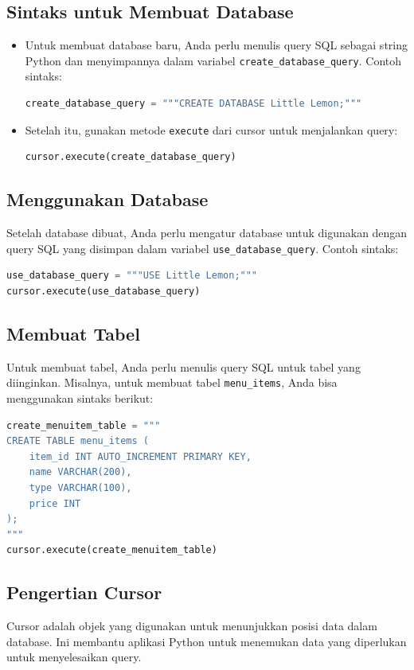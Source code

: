 \documentclass{article}
\begin{document}
\subsection{Sintaks untuk Membuat Database}
\begin{itemize}
      \item Untuk membuat database baru, Anda perlu menulis query SQL sebagai string Python dan menyimpannya dalam variabel \verb|create_database_query|. Contoh sintaks:
            \begin{lstlisting}[language=Python, caption={}, captionpos=b]
create_database_query = """CREATE DATABASE Little Lemon;"""
\end{lstlisting}
      \item Setelah itu, gunakan metode \verb|execute| dari cursor untuk menjalankan query:
            \begin{lstlisting}[language=Python, caption={}, captionpos=b]
cursor.execute(create_database_query)
\end{lstlisting}
\end{itemize}

\subsection{Menggunakan Database}
Setelah database dibuat, Anda perlu mengatur database untuk digunakan dengan query SQL yang disimpan dalam variabel \verb|use_database_query|. Contoh sintaks:
\begin{lstlisting}[language=Python, caption={}, captionpos=b]
use_database_query = """USE Little Lemon;"""
cursor.execute(use_database_query)
\end{lstlisting}

\subsection{Membuat Tabel}
Untuk membuat tabel, Anda perlu menulis query SQL untuk tabel yang diinginkan. Misalnya, untuk membuat tabel \verb|menu_items|, Anda bisa menggunakan sintaks berikut:
\begin{lstlisting}[language=Python, caption={}, captionpos=b]
create_menuitem_table = """
CREATE TABLE menu_items (
    item_id INT AUTO_INCREMENT PRIMARY KEY,
    name VARCHAR(200),
    type VARCHAR(100),
    price INT
);
"""
cursor.execute(create_menuitem_table)
\end{lstlisting}

\subsection{Pengertian Cursor}
Cursor adalah objek yang digunakan untuk menunjukkan posisi data dalam database. Ini membantu aplikasi Python untuk menemukan data yang diperlukan untuk menyelesaikan query.
\end{document}
